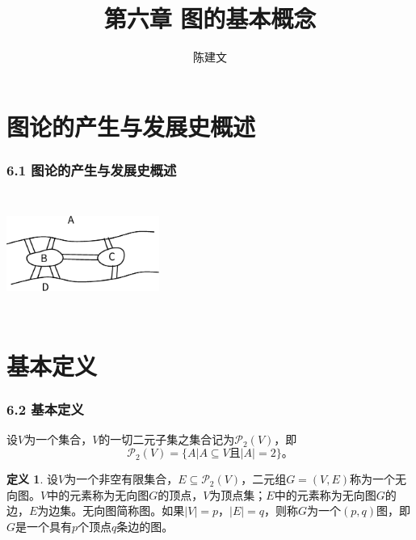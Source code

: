 \documentclass{beamer}
\theoremstyle{definition}
\newtheorem{Def}{定义}[section]
\theoremstyle{example}
\begin{document}
\begin{CJK*}{UTF8}{gbsn}

\date{}
\author{陈建文}

\title{第六章 图的基本概念}
\begin{frame}
  \titlepage
\end{frame}
\section{图论的产生与发展史概述}
\begin{frame}
  \frametitle{6.1 图论的产生与发展史概述}
  \centering
\includegraphics[width=5cm,height=4cm]{konigsberg} 
\end{frame}

\section{基本定义}
\begin{frame}
  \frametitle{6.2 基本定义}
设$V$为一个集合，$V$的一切二元子集之集合记为$\mathcal{P}_2(V)$，即
\begin{equation*}
  \mathcal{P}_2(V) = \{A|A \subseteq V \text{且} |A| = 2\}\text{。}
\end{equation*}
\begin{Def}\justifying\let\raggedright\justifying
  设$V$为一个非空有限集合，$E \subseteq \mathcal{P}_2(V)$，二元组$G = (V, E)$称为一个\alert{无向图}。$V$中的元素称为无向图$G$的\alert{顶点}，$V$为\alert{顶点集}；$E$中的元素称为无向图$G$的\alert{边}，$E$为\alert{边集}。无向图简称\alert{图}。如果$|V|=p$，$|E|=q$，则称$G$为一个$(p,q)$图，即$G$是一个具有$p$个顶点$q$条边的图。
\end{Def}
      \centering
\end{frame}
\end{CJK*}
\end{document}
